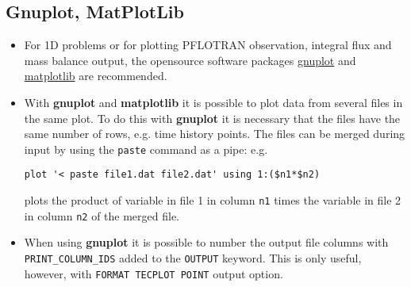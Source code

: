 \subsection{Gnuplot, MatPlotLib}

\begin{itemize}

\item For 1D problems or for plotting PFLOTRAN observation, integral flux and mass balance output, the opensource software packages \href{http://www.gnuplot.info/}{gnuplot} and \href{http://matplotlib.org/}{matplotlib} are recommended.
\item With {\bf gnuplot} and {\bf matplotlib} it is possible to plot data from several files in the same plot.
To do this with {\bf gnuplot} it is necessary that the files have the same number of rows, e.g. time history points. The files can be merged during input by using the {\tt paste} command as a pipe: e.g.

\verb|plot '< paste file1.dat file2.dat' using 1:($n1*$n2)|

\noindent
plots the product of variable in file 1 in column {\tt n1} times the variable in file 2 in column {\tt n2} of the merged file.

\item When using {\bf gnuplot} it is possible to number the output file columns with 
{\tt PRINT\_COLUMN\_IDS} added to the {\tt OUTPUT} keyword. This is only useful, however, with {\tt FORMAT TECPLOT POINT} output option.
\end{itemize}

